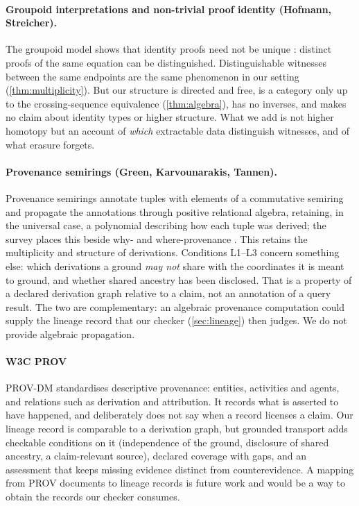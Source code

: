 \paragraph{Groupoid interpretations and non-trivial proof identity (Hofmann, Streicher).}
The groupoid model shows that identity proofs need not be unique \cite{hofmann1994,hofmann1998}: distinct proofs of the same equation can be distinguished. Distinguishable witnesses between the same endpoints are the same phenomenon in our setting (\cref{thm:multiplicity}). But our structure is directed and free, is a category only up to the crossing-sequence equivalence (\cref{thm:algebra}), has no inverses, and makes no claim about identity types or higher structure. What we add is not higher homotopy but an account of \emph{which} extractable data distinguish witnesses, and of what erasure forgets.

\paragraph{Provenance semirings (Green, Karvounarakis, Tannen).}
Provenance semirings \cite{green2007} annotate tuples with elements of a commutative semiring and propagate the annotations through positive relational algebra, retaining, in the universal case, a polynomial describing how each tuple was derived; the survey \cite{cheney2009} places this beside why- and where-provenance \cite{buneman2001}. This retains the multiplicity and structure of derivations. Conditions L1--L3 concern something else: which derivations a ground \emph{may not} share with the coordinates it is meant to ground, and whether shared ancestry has been disclosed. That is a property of a declared derivation graph relative to a claim, not an annotation of a query result. The two are complementary: an algebraic provenance computation could supply the lineage record that our checker (\cref{sec:lineage}) then judges. We do not provide algebraic propagation.

\paragraph{W3C PROV}
PROV-DM \cite{prov2013} standardises descriptive provenance: entities, activities and agents, and relations such as derivation and attribution. It records what is asserted to have happened, and deliberately does not say when a record licenses a claim. Our lineage record is comparable to a derivation graph, but grounded transport adds checkable conditions on it (independence of the ground, disclosure of shared ancestry, a claim-relevant source), declared coverage with gaps, and an assessment that keeps missing evidence distinct from counterevidence. A mapping from PROV documents to lineage records is future work and would be a way to obtain the records our checker consumes.

